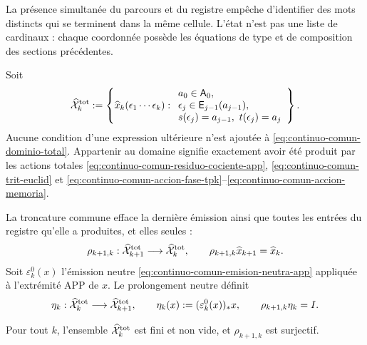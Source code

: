 La présence simultanée du parcours et du registre empêche d'identifier des mots distincts qui se terminent dans la même cellule. L'état n'est pas une liste de cardinaux : chaque coordonnée possède les équations de type et de composition des sections précédentes.

\begin{definition}
\label{def:continuo-comun-dominio-total}
Soit
\begin{equation}
\label{eq:continuo-comun-dominio-total}
 \widehat{\mathcal X}^{\rm tot}_k
 :=\left\{
  \widehat x_k(\epsilon_1\cdots\epsilon_k):
  \begin{array}{l}
   a_0\in\mathsf A_0,\\
   \epsilon_j\in\mathsf E_{j-1}(a_{j-1}),\\
   s(\epsilon_j)=a_{j-1},\ t(\epsilon_j)=a_j
  \end{array}
 \right\}.
\end{equation}
Aucune condition d'une expression ultérieure n'est ajoutée à \eqref{eq:continuo-comun-dominio-total}. Appartenir au domaine signifie exactement avoir été produit par les actions totales \eqref{eq:continuo-comun-residuo-cociente-app}, \eqref{eq:continuo-comun-trit-euclid} et \eqref{eq:continuo-comun-accion-fase-tpk}--\eqref{eq:continuo-comun-accion-memoria}.
\end{definition}

La troncature commune efface la dernière émission ainsi que toutes les entrées du registre qu'elle a produites, et elles seules :
\begin{equation}
\label{eq:continuo-comun-truncamiento-total}
 \rho_{k+1,k}:\widehat{\mathcal X}^{\rm tot}_{k+1}
 \longrightarrow\widehat{\mathcal X}^{\rm tot}_k,
 \qquad
 \rho_{k+1,k}\widehat x_{k+1}
 =\widehat x_k.
\end{equation}
Soit \(\varepsilon^0_k(x)\) l'émission neutre \eqref{eq:continuo-comun-emision-neutra-app} appliquée à l'extrémité APP de \(x\). Le prolongement neutre définit
\begin{equation}
\label{eq:continuo-comun-seccion-total}
 \eta_k:\widehat{\mathcal X}^{\rm tot}_k
 \longrightarrow\widehat{\mathcal X}^{\rm tot}_{k+1},
 \qquad
 \eta_k(x):=(\varepsilon^0_k(x))_*x,
 \qquad
 \rho_{k+1,k}\eta_k=I.
\end{equation}

\begin{proposition}
\label{prop:continuo-comun-total-finito}
Pour tout \(k\), l'ensemble \(\widehat{\mathcal X}^{\rm tot}_k\) est fini et non vide, et \(\rho_{k+1,k}\) est surjectif.
\end{proposition}

